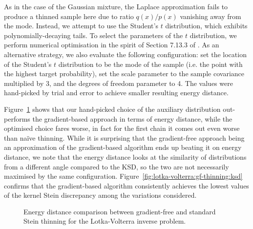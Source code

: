 \documentclass[11pt,a4paper]{report}
\begin{document}
As in the case of the Gaussian mixture, the Laplace approximation fails to produce a thinned sample here due to ratio $q(x) / p(x)$ vanishing away from the mode. Instead, we attempt to use the Student's $t$ distribution, which exhibits polynomially-decaying tails. To select the parameters of the $t$ distribution, we perform numerical optimisation in the spirit of Section 7.13.3 of \cite{ruppertStatisticsDataAnalysis2015}. As an alternative strategy, we also evaluate the following configuration: set the location of the Student's $t$ distribution to be the mode of the sample (i.e. the point with the highest target probability), set the scale parameter to the sample covariance multiplied by 3, and the degrees of freedom parameter to 4. The values were hand-picked by trial and error to achieve smaller resulting energy distance.

Figure~\ref{fig:lotka-volterra:gf-thinning:energy-distance} shows that our hand-picked choice of the auxiliary distribution out-performs the gradient-based approach in terms of energy distance, while the optimised choice fares worse, in fact for the first chain it comes out even worse than na\"ive thinning. While it is surprising that the gradient-free approach being an approximation of the gradient-based algorithm ends up beating it on energy distance, we note that the energy distance looks at the similarity of distributions from a different angle compared to the KSD, so the two are not necessarily maximised by the same configuration. Figure~\ref{fig:lotka-volterra:gf-thinning:ksd} confirms that the gradient-based algorithm consistently achieves the lowest values of the kernel Stein discrepancy among the variations considered.

\begin{figure}[h]
\centering
{}
\caption{Energy distance comparison between gradient-free and standard Stein thinning for the Lotka-Volterra inverse problem.
\label{fig:lotka-volterra:gf-thinning:energy-distance}}
\end{figure}
\end{document}
